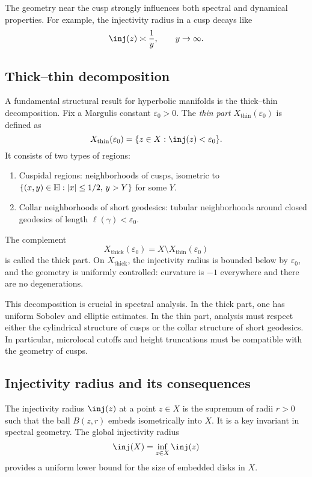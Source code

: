 The geometry near the cusp strongly influences both spectral and dynamical properties. 
For example, the injectivity radius in a cusp decays like
\[
\inj(z) \asymp \frac{1}{y}, \qquad y \to \infty.
\]

\subsection{Thick--thin decomposition}\label{subsec:thickthin}

A fundamental structural result for hyperbolic manifolds is the thick--thin decomposition. 
Fix a Margulis constant $\varepsilon_0 > 0$. 
The \emph{thin part} $X_{\mathrm{thin}}(\varepsilon_0)$ is defined as
\[
X_{\mathrm{thin}}(\varepsilon_0) = \{ z \in X : \inj(z) < \varepsilon_0 \}.
\]
It consists of two types of regions:
\begin{enumerate}
  \item Cuspidal regions: neighborhoods of cusps, isometric to 
        $\{(x,y) \in \mathbb{H} : |x| \le 1/2,\, y > Y\}$ for some $Y$.
  \item Collar neighborhoods of short geodesics: tubular neighborhoods around closed geodesics of length $\ell(\gamma) < \varepsilon_0$.
\end{enumerate}

The complement
\[
X_{\mathrm{thick}}(\varepsilon_0) = X \setminus X_{\mathrm{thin}}(\varepsilon_0)
\]
is called the thick part. On $X_{\mathrm{thick}}$, the injectivity radius is bounded below by $\varepsilon_0$, 
and the geometry is uniformly controlled: curvature is $-1$ everywhere and there are no degenerations.

This decomposition is crucial in spectral analysis. 
In the thick part, one has uniform Sobolev and elliptic estimates. 
In the thin part, analysis must respect either the cylindrical structure of cusps or the collar structure of short geodesics. 
In particular, microlocal cutoffs and height truncations must be compatible with the geometry of cusps.

\subsection{Injectivity radius and its consequences}\label{subsec:injrad}

The injectivity radius $\inj(z)$ at a point $z \in X$ is the supremum of radii $r>0$ such that the ball $B(z,r)$ embeds isometrically into $X$. 
It is a key invariant in spectral geometry. The global injectivity radius
\[
\inj(X) = \inf_{z \in X} \inj(z)
\]
provides a uniform lower bound for the size of embedded disks in $X$. 

